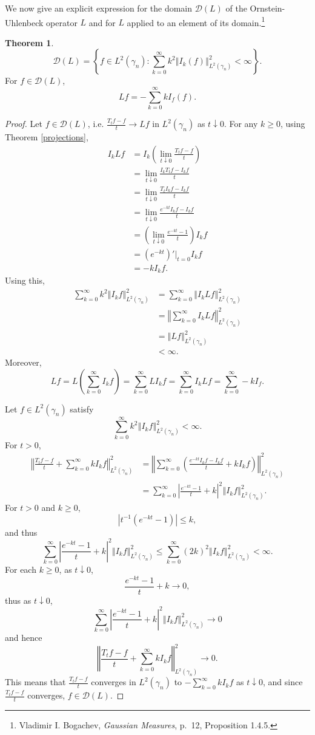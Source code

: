 \documentclass{article}
\newcommand{\norm}[1]{\left\Vert #1 \right\Vert}
\theoremstyle{definition}
\newtheorem{theorem}{Theorem}
\theoremstyle{definition}
\begin{document}
We now give an explicit expression for the domain $\mathscr{D}(L)$ of the Ornstein-Uhlenbeck operator $L$ and for $L$ applied to an element of
its domain.\footnote{Vladimir I. Bogachev, {\em Gaussian Measures}, p.~12, Proposition 1.4.5.}

\begin{theorem}
\[
\mathscr{D}(L) = \left\{f \in L^2(\gamma_n) : \sum_{k=0}^\infty k^2 \norm{I_k(f)}_{L^2(\gamma_n)}^2<\infty\right\}.
\]
For $f \in \mathscr{D}(L)$,
\[
Lf = -\sum_{k=0}^\infty k I_f(f).
\]
\end{theorem}
\begin{proof}
Let $f \in \mathscr{D}(L)$, i.e. $\frac{T_t f - f}{t} \to Lf$ in $L^2(\gamma_n)$ as $t \downarrow 0$. For any $k \geq 0$, using
Theorem \ref{projections},
\begin{align*}
I_k L f&=I_k\left(\lim_{t \downarrow 0} \frac{T_t f-f}{t} \right)\\
&=\lim_{t \downarrow 0} \frac{I_kT_t f - I_kf}{t}\\
&=\lim_{t \downarrow 0} \frac{T_t I_k f - I_k f}{t}\\
&=\lim_{t \downarrow 0}  \frac{e^{-kt} I_k f - I_k f}{t}\\
&=\left( \lim_{t \downarrow 0} \frac{e^{-kt}-1}{t}\right) I_k f\\
&=\left(e^{-kt}\right)'\big|_{t=0} I_kf\\
&=-kI_kf.
\end{align*}
Using this, 
\begin{align*}
\sum_{k=0}^\infty k^2 \norm{I_k f}_{L^2(\gamma_n)}^2&=\sum_{k=0}^\infty \norm{I_k Lf}_{L^2(\gamma_n)}^2\\
&=\norm{\sum_{k=0}^\infty I_k Lf}_{L^2(\gamma_n)}^2\\
&=\norm{Lf}_{L^2(\gamma_n)}^2\\
&<\infty.
\end{align*}
Moreover,
\[
Lf = L\left(\sum_{k=0}^\infty I_k f \right)
=\sum_{k=0}^\infty LI_k f
=\sum_{k=0}^\infty I_kLf
=\sum_{k=0}^\infty -kI_f.
\]

Let $f \in L^2(\gamma_n)$ satisfy 
\[
\sum_{k=0}^\infty k^2 \norm{I_k f}_{L^2(\gamma_n)}^2<\infty.
\]
For $t>0$,
\begin{align*}
\norm{\frac{T_t f-f}{t} + \sum_{k=0}^\infty kI_kf}_{L^2(\gamma_n)}^2&=
\norm{\sum_{k=0}^\infty \left( \frac{e^{-kt} I_k f - I_k f}{t} + kI_kf\right)}_{L^2(\gamma_n)}^2\\
&=\sum_{k=0}^\infty \left|\frac{e^{-kt}-1}{t}+k\right|^2 \norm{I_k f}_{L^2(\gamma_n)}^2.
\end{align*}
For $t>0$ and $k \geq 0$,
\[
|t^{-1}(e^{-kt}-1)| \leq k,
\]
and thus
\[
\sum_{k=0}^\infty \left|\frac{e^{-kt}-1}{t}+k\right|^2 \norm{I_k f}_{L^2(\gamma_n)}^2
\leq \sum_{k=0}^\infty (2k)^2  \norm{I_k f}_{L^2(\gamma_n)}^2
<\infty.
\]
For each $k \geq 0$, as $t \downarrow 0$, 
\[
\frac{e^{-kt}-1}{t}+k \to 0,
\]
thus as $t \downarrow 0$,
\[
\sum_{k=0}^\infty \left|\frac{e^{-kt}-1}{t}+k\right|^2 \norm{I_k f}_{L^2(\gamma_n)}^2  \to 0
\]
and hence
\[
\norm{\frac{T_t f-f}{t} + \sum_{k=0}^\infty kI_kf}_{L^2(\gamma_n)}^2 \to 0.
\]
This means that
$\frac{T_t f -f}{t}$ converges in $L^2(\gamma_n)$ to $-\sum_{k=0}^\infty kI_kf$ as $t \downarrow 0$, and since
$\frac{T_t f-f}{t}$ converges, $f \in \mathscr{D}(L)$. 
\end{proof}
\end{document}
